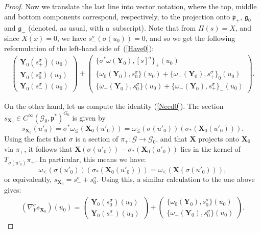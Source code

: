 \documentclass[11pt]{article}
\def\g{\mathfrak{g}}
\def\p{\mathfrak{p}}
\def\Gbdle{\mathcal{G}}
\theoremstyle{plain}
\theoremstyle{definition}
\begin{document}
\begin{proof}
 Now we translate the last line into vector notation, where the top, middle and bottom components correspond, respectively, to the projection onto $\p_+$, $\g_0$ and $\g_-$ (denoted, as usual, with a~subscript). Note that from $\Pi(s) = X$, and since $X(x) = 0$, we have $s^{\sigma}_-(\sigma(u_0)) = 0$, and so we get the following reformulation of the left-hand side of~(\ref{Have0}):
\begin{gather}
\left(\begin{array}{c}
    \mathbf{Y}_0(s^{\sigma}_+)(u_0) \\
    \mathbf{Y}_0(s^{\sigma}_0)(u_0) \\
    \mathbf{Y}_0(s^{\sigma}_-)(u_0)\end{array}\right) +
\left(\begin{array}{c}
    \{\sigma^*\omega(\mathbf{Y}_0),[s]^{\sigma}\}_+(u_0) \\
    \{\omega_0(\mathbf{Y}_0),s_0^{\sigma}\}(u_0) + \{\omega_{-}(\mathbf{Y}_0),s^{\sigma}_+\}_0(u_0) \\
    \{\omega_{-}(\mathbf{Y}_0),s^{\sigma}_0\}(u_0) +
    \{\omega_{-}(\mathbf{Y}_0),s^{\sigma}_+\}_-(u_0)
     \end{array}\right). \label{Have0 wrt sigma}
\end{gather}

On the other hand, let us compute the identity (\ref{Need0}). The section $s_{\mathbf{X}_0} \in C^{\infty}(\Gbdle_0,\p^*)^{G_0}$ is given by
\[
s_{\mathbf{X}_0}(u'_0) = \sigma^* \omega_{\leq}(\mathbf{X}_0(u'_0)) = \omega_{\leq}(\sigma(u'_0))(\sigma_*(\mathbf{X}_0(u'_0))).
\]
Using the facts that $\sigma$ is a section of $\pi_+:\Gbdle \rightarrow \Gbdle_0$, and that $\mathbf{X}$ projects onto $\mathbf{X}_0$ via $\pi_+$, it follows that $\mathbf{X}(\sigma(u'_0)) - \sigma_*(\mathbf{X}_0(u'_0))$ lies in the kernel of $T_{\sigma(u'_0)} \pi_+$. In particular, this means we have:
\[
\omega_{\leq}(\sigma(u'_0))(\sigma_*(\mathbf{X}_0(u'_0))) = \omega_{\leq}(\mathbf{X}(\sigma(u'_0))),
\]
or equivalently, $s_{\mathbf{X}_0} = s^{\sigma}_- + s^{\sigma}_0$. Using this, a similar calculation to the one above gives:
\begin{gather}
(\nabla^{\sigma}_Y s_{\mathbf{X}_0})(u_0) =
    \left(\begin{array}{c}
    \mathbf{Y}_0(s^{\sigma}_0)(u_0) \\
    \mathbf{Y}_0(s^{\sigma}_-)(u_0)\end{array}\right) +
    \left(\begin{array}{c}
    \{\omega_0(\mathbf{Y}_0),s_0^{\sigma}\}(u_0) \\
    \{\omega_{-}(\mathbf{Y}_0),s^{\sigma}_0\}(u_0) \end{array}\right).
\label{Need0 wrt sigma}
\end{gather}


\end{proof}
\end{document}
